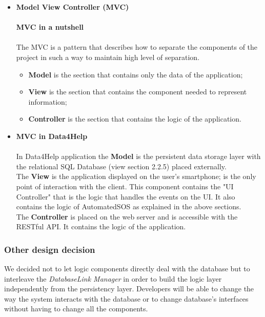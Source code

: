 \documentclass[DD.tex]{subfiles}
\begin{document}
\begin{itemize}
	\item \textbf{Model View Controller (MVC)}\\\\
		\textbf{MVC in a nutshell}\\\\
		The MVC is a pattern that describes how to separate the components of the project in such a way to maintain high level of separation. \\
		\vspace{-5mm}
		\begin{itemize}
		\setlength\itemsep{-0.9em}
			\item\textbf{Model} is the section that contains only the data of the application;\\
			\item\textbf{View} is the section that contains the component needed to represent information;\\
			\item\textbf{Controller} is the section that contains the logic of the application.\\
		\end{itemize}
		\newpage
	\item \textbf{MVC in Data4Help}\\\\
		In Data4Help application the \textbf{Model} is the persistent data storage layer with the relational SQL Database (view section 2.2.5) placed externally.\\
		The \textbf{View} is the application displayed on the user's smartphone; is the only point of interaction with the client.
		This component contains the "UI Controller" that is the logic that handles the events on the UI. It also contains the logic of AutomatedSOS as explained in the above sections.\\
		The \textbf{Controller} is placed on the web server and is accessible with the RESTful API. It contains the logic of the application.\\
\end{itemize}

\subsubsection{Other design decision}
We decided not to let logic components directly deal with the database but to interleave the \textit{DatabaseLink Manager} in order to build the logic layer independently from the persistency layer. Developers will be able to change the way the system interacts with the database or to change database's interfaces without having to change all the components. 
\end{document}
